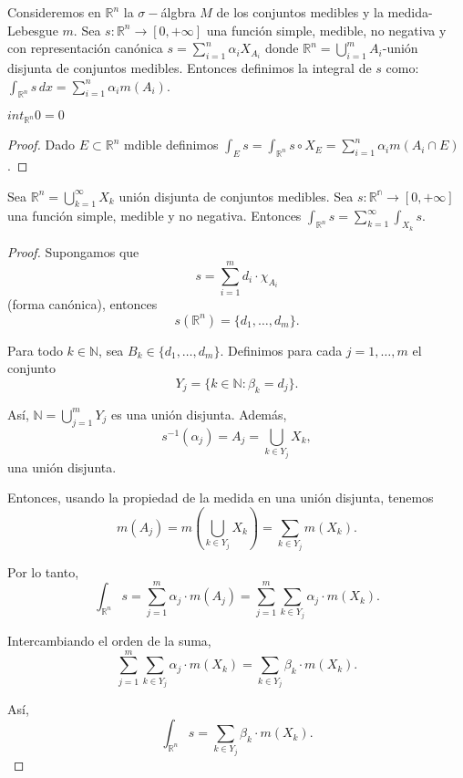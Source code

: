 \begin{definición}
    Consideremos en $\mathbb{R}^n$ la $\sigma-$álgbra $M$ de los conjuntos medibles y la medida-Lebesgue $m$. Sea $s: \mathbb{R}^n \to [0, +\infty]$ una función simple, medible, no negativa y con representación canónica $s = \sum_{i = 1}^{n}\alpha_iX_{A_i}$ donde $\mathbb{R}^n = \bigcup_{i = 1}^{m}A_i$-unión disjunta de conjuntos medibles. Entonces definimos la integral de $s$ como: $\int_{\mathbb{R}^n}s \, dx = \sum_{i = 1}^{n}\alpha_im(A_i)$.
\end{definición}
\begin{observación}
    $int_{\mathbb{R}^n}0 = 0$
\end{observación}
\begin{proof}
    Dado $E \subset \mathbb{R}^n$ mdible definimos $\int_{E}s = \int_{\mathbb{R}^n}s\circ X_E = \sum_{i = 1}^{n}\alpha_im(A_i \cap E)$.
\end{proof}
\begin{lema}
    Sea $\mathbb{R}^n = \bigcup_{k = 1}^{\infty}X_k$ unión disjunta de conjuntos medibles. Sea $s: \mathbb{R^n} \to [0, +\infty]$ una función simple, medible y no negativa. Entonces $\int_{\mathbb{R}^n}s = \sum_{k = 1}^{\infty}\int_{X_k}s$.
\end{lema}
\begin{proof}
    Supongamos que 
    $$ s = \sum_{i=1}^{m} d_i \cdot \chi_{A_i} $$ 
    (forma canónica), entonces  
    $$ s(\mathbb{R}^n) = \{ d_1, \dots, d_m \}. $$
    
    Para todo $k \in \mathbb{N}$, sea $B_k \in \{ d_1, \dots, d_m \}$. Definimos para cada $j = 1, \dots, m$ el conjunto  
    $$ Y_j = \{ k \in \mathbb{N} : \beta_k = d_j \}. $$
    
    Así, $\mathbb{N} = \bigcup_{j=1}^{m} Y_j$ es una unión disjunta.  
    Además,  
    $$ s^{-1}(\alpha_j) = A_j = \bigcup_{k \in Y_j} X_k, $$ 
    una unión disjunta.
    
    Entonces, usando la propiedad de la medida en una unión disjunta, tenemos  
    $$ m(A_j) = m \left( \bigcup_{k \in Y_j} X_k \right) = \sum_{k \in Y_j} m(X_k). $$
    
    Por lo tanto,  
    $$ \int_{\mathbb{R}^n} s = \sum_{j=1}^{m} \alpha_j \cdot m(A_j) = \sum_{j=1}^{m} \sum_{k \in Y_j} \alpha_j \cdot m(X_k). $$
    
    Intercambiando el orden de la suma,  
    $$ \sum_{j=1}^{m} \sum_{k \in Y_j} \alpha_j \cdot m(X_k) = \sum_{k \in Y_j} \beta_k \cdot m(X_k). $$
    
    Así,  
    $$ \int_{\mathbb{R}^n} s = \sum_{k \in Y_j} \beta_k \cdot m(X_k). $$
\end{proof}
